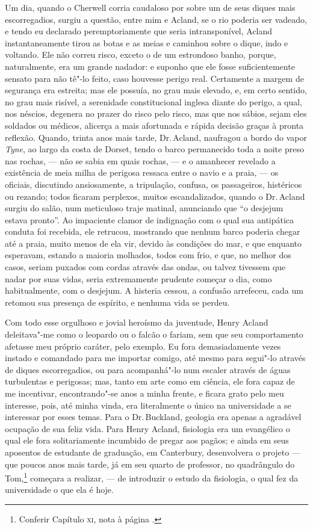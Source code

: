 Um dia, quando o Cherwell corria caudaloso por sobre um de seus diques
mais escorregadios, surgiu a questão, entre mim e Acland, se o rio
poderia ser vadeado, e tendo eu declarado peremptoriamente que seria
intransponível, Acland instantaneamente tirou as botas e as meias e
caminhou sobre o dique, indo e voltando. Ele não correu risco, exceto o
de um estrondoso banho, porque, naturalmente, era um grande nadador: e
suponho que ele fosse suficientemente sensato para não tê"-lo feito, caso
houvesse perigo real. Certamente a margem de segurança era estreita; mas
ele possuía, no grau mais elevado, e, em certo sentido, no grau mais
risível, a serenidade constitucional inglesa diante do perigo, a qual,
nos néscios, degenera no prazer do risco pelo risco, mas que nos sábios,
sejam eles soldados ou médicos, alicerça a mais afortunada e rápida
decisão graças à pronta reflexão. Quando, trinta anos mais tarde, Dr.\,Acland, naufragou a bordo do vapor \textit{Tyne}, ao largo da costa de
Dorset, tendo o barco permanecido toda a noite preso nas rochas, --- não
se sabia em quais rochas, --- e o amanhecer revelado a existência de meia
milha de perigosa ressaca entre o navio e a praia, --- os oficiais,
discutindo ansiosamente, a tripulação, confusa, os passageiros,
histéricos ou rezando; todos ficaram perplexos, muitos escandalizados,
quando o Dr.\,Acland surgiu do salão, num meticuloso traje matinal,
anunciando que ``o desjejum estava pronto''. Ao impaciente clamor de
indignação com o qual sua antipática conduta foi recebida, ele retrucou,
mostrando que nenhum barco poderia chegar até a praia, muito menos de
ela vir, devido às condições do mar, e que enquanto esperavam, estando a
maioria molhados, todos com frio, e que, no melhor dos casos, seriam
puxados com cordas através das ondas, ou talvez tivessem que nadar por
suas vidas, seria extremamente prudente começar o dia, como
habitualmente, com o desjejum. A histeria cessou, a confusão arrefeceu,
cada um retomou sua presença de espírito, e nenhuma vida se perdeu.

Com todo esse orgulhoso e jovial heroísmo da juventude, Henry
Acland deleitava"-me como o leopardo ou o falcão o fariam, sem que seu
comportamento afetasse meu próprio caráter, pelo exemplo. Eu fora
demasiadamente vezes instado e comandado para me importar comigo, até
mesmo para segui"-lo através de diques escorregadios, ou para
acompanhá"-lo num escaler através de águas turbulentas e perigosas; mas,
tanto em arte como em ciência, ele fora capaz de me incentivar,
encontrando"-se anos a minha frente, e ficara grato pelo meu interesse,
pois, até minha vinda, era literalmente o único na universidade a se
interessar por esses temas. Para o Dr.\,Buckland, geologia era apenas a
agradável ocupação de sua feliz vida. Para Henry Acland, fisiologia era
um evangélico o qual ele fora solitariamente incumbido de pregar aos
pagãos; e ainda em seus aposentos de estudante de graduação, em
Canterbury, desenvolvera o projeto --- que poucos anos mais tarde, já em
seu quarto de professor, no quadrângulo do Tom,\footnote{Conferir
  Capítulo \textsc{xi}, nota à página \pageref{tom}.} começara a realizar, --- de
introduzir o estudo da fisiologia, o qual fez da universidade o que ela
é hoje.

